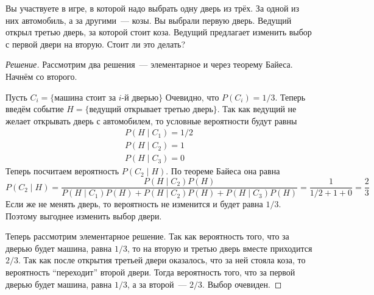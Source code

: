 \documentclass[a4paper,12pt]{article}
\begin{document}
\begin{problem}
	Вы участвуете в игре, в которой надо выбрать одну дверь из трёх. За одной из них автомобиль, а за другими~--- козы. Вы выбрали первую дверь. Ведущий открыл третью дверь, за которой стоит коза. Ведущий предлагает изменить выбор с первой двери на вторую. Стоит ли это делать?
\end{problem}
\begin{proof}[Решение]
	Рассмотрим два решения~--- элементарное и через теорему Байеса. Начнём со второго.
	
	Пусть \(C_{i} = \{\text{машина стоит за }i\text{-й дверью}\}\) Очевидно, что \(P(C_i) = 1/3\). Теперь введём событие \(H = \{\text{ведущий открывает третью дверь}\}\). Так как ведущий не желает открывать дверь с автомобилем, то условные вероятности будут равны
	\[\begin{array}{l}
	P(H \mid C_1) = 1/2 \\
	P(H \mid C_2) = 1 \\
	P(H \mid C_3) = 0
	\end{array}\]
	Теперь посчитаем вероятность \(P(C_2 \mid H)\). По теореме Байеса она равна
	\[P(C_2 \mid H) = \frac{P(H \mid C_2)P(H)}{P(H \mid C_1)P(H) + P(H \mid C_2)P(H) + P(H \mid C_3)P(H)} = \frac{1}{1/2 + 1 + 0} = \frac{2}{3}\]
	Если же не менять дверь, то вероятность не изменится и будет равна \(1/3\). Поэтому выгоднее изменить выбор двери.
	
	Теперь рассмотрим элементарное решение. Так как вероятность того, что за дверью будет машина, равна \(1/3\), то на вторую и третью дверь вместе приходится \(2/3\). Так как после открытия третьей двери оказалось, что за ней стояла коза, то вероятность ``переходит'' второй двери. Тогда вероятность того, что за первой дверью будет машина, равна \(1/3\), а за второй~--- \(2/3\). Выбор очевиден.
\end{proof}
\end{document}
